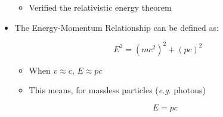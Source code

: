 \begin{itemize}
\begin{itemize}
      \item Verified the relativistic energy theorem

    \end{itemize}

  \item The Energy-Momentum Relationship can be defined as:

    $$E^2=(mc^2)^2+(pc)^2$$

    \begin{itemize}

      \item When $v\approx c$, $E\approx pc$

      \item This means, for massless particles (\textit{e}.\textit{g}. photons)

        $$\boxed{E=pc}$$

    \end{itemize}

\end{itemize}



